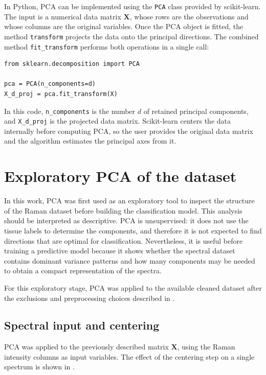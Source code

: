 In Python, PCA can be implemented using the \texttt{PCA} class provided by
scikit-learn. The input is a numerical data matrix \(\mathbf{X}\), whose rows are the
observations and whose columns are the original variables. Once the PCA object is fitted,
the method \texttt{transform} projects the data onto the principal directions. The
combined method \texttt{fit\_transform} performs both operations in a single call:

\begin{verbatim}
from sklearn.decomposition import PCA

pca = PCA(n_components=d)
X_d_proj = pca.fit_transform(X)
\end{verbatim}

In this code, \texttt{n\_components} is the number \(d\) of retained principal
components, and \texttt{X\_d\_proj} is the projected data matrix. Scikit-learn centers
the data internally before computing PCA, so the user provides the original data matrix
and the algorithm estimates the principal axes from it.



\section{Exploratory PCA of the dataset}
\label{sec:pca_dataset}

In this work, PCA was first used as an exploratory tool to inspect the structure of the Raman dataset before building the classification model. This analysis should be interpreted as descriptive. PCA is unsupervised: it does not use
the tissue labels to determine the components, and therefore it is not expected to find
directions that are optimal for classification. Nevertheless, it is useful before
training a predictive model because it shows whether the spectral dataset contains
dominant variance patterns and how many components may be needed to obtain a compact representation of the
spectra.


For this exploratory stage, PCA was applied to the available cleaned dataset after the
exclusions and preprocessing choices described in . 

\subsection{Spectral input and centering}
\label{subsec:pca_input_centering}

PCA was applied to the previously described matrix \(\mathbf{X}\), using the Raman
intensity columns as input variables. The effect of the centering step on a single
spectrum is shown in .

